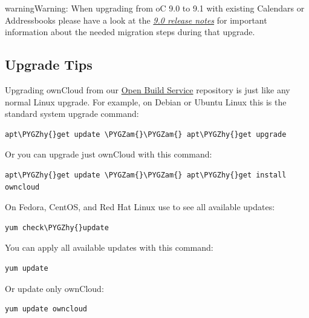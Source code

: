 \documentclass[letterpaper,10pt,english]{sphinxmanual}
\def\PYGZam{\char`\&}
\def\PYGZhy{\char`\-}
\begin{document}
\begin{notice}{warning}{Warning:}
When upgrading from oC 9.0 to 9.1 with existing Calendars or Addressbooks
please have a look at the {\hyperref[release_notes:release\string-notes\string-label]{\emph{9.0 release notes}}} for
important information about the needed migration steps during that upgrade.
\end{notice}


\subsection{Upgrade Tips}
\label{maintenance/package_upgrade:upgrade-tips}
Upgrading ownCloud from our \href{https://download.owncloud.org/download/repositories/stable/owncloud/}{Open Build Service} repository is just like any
normal Linux upgrade. For example, on Debian or Ubuntu Linux this is the
standard system upgrade command:

\begin{Verbatim}[commandchars=\\\{\}]
apt\PYGZhy{}get update \PYGZam{}\PYGZam{} apt\PYGZhy{}get upgrade
\end{Verbatim}

Or you can upgrade just ownCloud with this command:

\begin{Verbatim}[commandchars=\\\{\}]
apt\PYGZhy{}get update \PYGZam{}\PYGZam{} apt\PYGZhy{}get install owncloud
\end{Verbatim}

On Fedora, CentOS, and Red Hat Linux use  to see all available updates:

\begin{Verbatim}[commandchars=\\\{\}]
yum check\PYGZhy{}update
\end{Verbatim}

You can apply all available updates with this command:

\begin{Verbatim}[commandchars=\\\{\}]
yum update
\end{Verbatim}

Or update only ownCloud:

\begin{Verbatim}[commandchars=\\\{\}]
yum update owncloud
\end{Verbatim}
\end{document}
